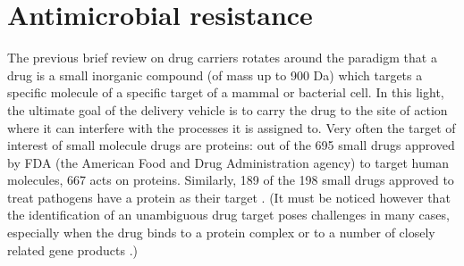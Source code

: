 \section{Antimicrobial resistance}


The previous brief review on drug carriers rotates around the paradigm that a drug is a small inorganic compound (of mass up to 900 Da) which targets a specific molecule of a specific target of a mammal or bacterial cell. In this light, the ultimate goal of the delivery vehicle is to carry the drug to the site of action where it can interfere with the processes it is assigned to. Very often the target of interest of small molecule drugs are proteins: out of the 695 small drugs approved by FDA (the American Food and Drug Administration agency) to target human molecules, 667 acts on proteins. Similarly, 189 of the 198 small drugs approved to treat pathogens have a protein as their target \cite{Santos2017}.
%
(It must be noticed however that the identification of an unambiguous drug target poses challenges in many cases, especially when the drug binds to a protein complex or to a number of closely related gene products \cite{Santos2017}.)

